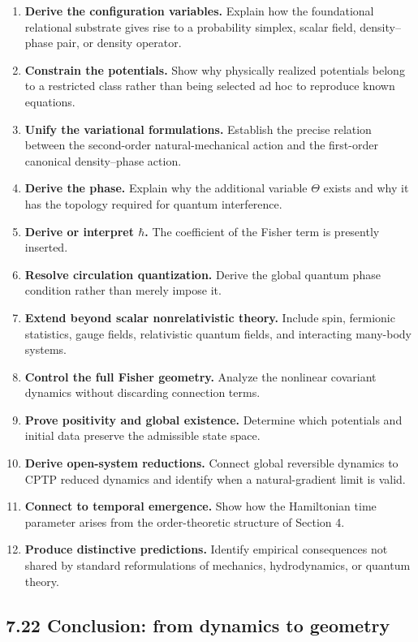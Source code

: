 \documentclass[
  11pt,
]{article}
\begin{document}
\begin{enumerate}
\def\labelenumi{\arabic{enumi}.}
\item
  \textbf{Derive the configuration variables.} Explain how the
  foundational relational substrate gives rise to a probability simplex,
  scalar field, density--phase pair, or density operator.
\item
  \textbf{Constrain the potentials.} Show why physically realized
  potentials belong to a restricted class rather than being selected ad
  hoc to reproduce known equations.
\item
  \textbf{Unify the variational formulations.} Establish the precise
  relation between the second-order natural-mechanical action and the
  first-order canonical density--phase action.
\item
  \textbf{Derive the phase.} Explain why the additional variable
  \(\Theta\) exists and why it has the topology required for quantum
  interference.
\item
  \textbf{Derive or interpret \(\hbar\).} The coefficient of the Fisher
  term is presently inserted.
\item
  \textbf{Resolve circulation quantization.} Derive the global quantum
  phase condition rather than merely impose it.
\item
  \textbf{Extend beyond scalar nonrelativistic theory.} Include spin,
  fermionic statistics, gauge fields, relativistic quantum fields, and
  interacting many-body systems.
\item
  \textbf{Control the full Fisher geometry.} Analyze the nonlinear
  covariant dynamics without discarding connection terms.
\item
  \textbf{Prove positivity and global existence.} Determine which
  potentials and initial data preserve the admissible state space.
\item
  \textbf{Derive open-system reductions.} Connect global reversible
  dynamics to CPTP reduced dynamics and identify when a natural-gradient
  limit is valid.
\item
  \textbf{Connect to temporal emergence.} Show how the Hamiltonian time
  parameter arises from the order-theoretic structure of Section 4.
\item
  \textbf{Produce distinctive predictions.} Identify empirical
  consequences not shared by standard reformulations of mechanics,
  hydrodynamics, or quantum theory.
\end{enumerate}

\subsection{7.22 Conclusion: from dynamics to
geometry}\label{conclusion-from-dynamics-to-geometry}
\end{document}
